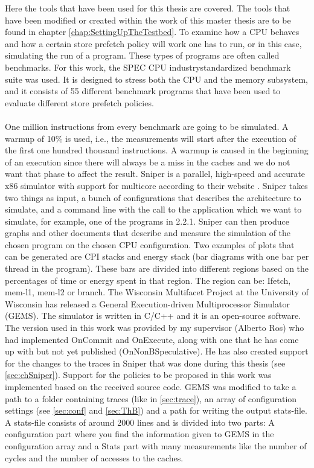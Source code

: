 Here the tools that have been used for this thesis are covered. The tools that have been modified or created within the work of this master thesis
are to be found in chapter \ref{chap:SettingUpTheTestbed}.
To examine how a CPU behaves and how a certain store prefetch policy will work
one has to run, or in this case, simulating the run of a program. These types of programs are often called benchmarks. For this work, the SPEC CPU  industrystandardized benchmark suite \cite{specCpu} was used. It is designed to stress both the CPU and the memory subsystem, and it consists of 55 different benchmark programs that have been used to evaluate different store prefetch policies.
\\ \\
One million instructions from every benchmark are going to be simulated. A warmup of 10\% is used, i.e., the measurements will start after the execution of the first one hundred thousand instructions. A warmup is caused in the beginning of an execution since there will always be a miss in the caches and we do not want that phase to affect the result.
Sniper is a parallel, high-speed and accurate x86 simulator with support for multicore
according to their website \cite{sniper}. Sniper takes two things as input, a bunch of configurations
that describes the architecture to simulate, and a command line with the call to
the application which we want to simulate, for example, one of the programs in 2.2.1.
Sniper can then produce graphs and other documents that describe and measure the
simulation of the chosen program on the chosen CPU configuration. Two examples
of plots that can be generated are CPI stacks \cite{cpi} and energy stack (bar diagrams with one bar per thread in the program). These bars are divided into different regions
based on the percentages of time or energy spent in that region. The region can be:
Ifetch, mem-l1, mem-l2 or branch.
The Wisconsin Multifacet Project at the University of Wisconsin has released a General
Execution-driven Multiprocessor Simulator (GEMS). The simulator is written in
 C/C++ and it is an open-source software. The version used in this work was provided
by my supervisor (Alberto Ros) who had implemented OnCommit and OnExecute,
along with one that he has come up with but not yet published (OnNonBSpeculative).
He has also created support for the changes to the traces in Sniper that was done
during this thesis (see \ref{sec:chSniper}). Support for the policies to be proposed in this work was
implemented based on the received source code. 
GEMS was modified to take a path
to a folder containing traces (like in \ref{sec:trace}), an array of configuration settings (see \ref{sec:conf} and \ref{sec:ThB}) and a path for writing the output stats-file. A stats-file consists of around
2000 lines and is divided into two parts: A configuration part where you find the
information given to GEMS in the configuration array and a Stats part with many
measurements like the number of cycles and the number of accesses to the caches.

